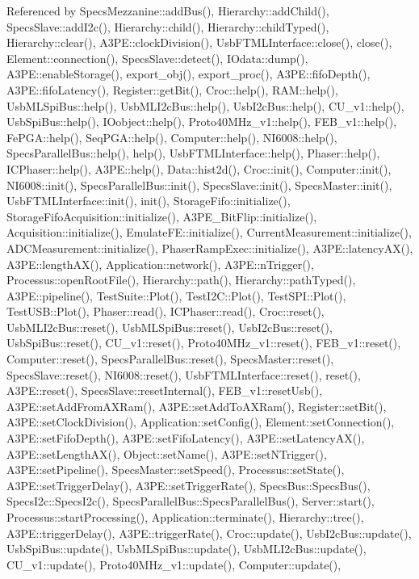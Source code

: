 Referenced by Specs\+Mezzanine\+::add\+Bus(), Hierarchy\+::add\+Child(), Specs\+Slave\+::add\+I2c(), Hierarchy\+::child(), Hierarchy\+::child\+Typed(), Hierarchy\+::clear(), A3\+P\+E\+::clock\+Division(), Usb\+F\+T\+M\+L\+Interface\+::close(), close(), Element\+::connection(), Specs\+Slave\+::detect(), I\+Odata\+::dump(), A3\+P\+E\+::enable\+Storage(), export\+\_\+obj(), export\+\_\+proc(), A3\+P\+E\+::fifo\+Depth(), A3\+P\+E\+::fifo\+Latency(), Register\+::get\+Bit(), Croc\+::help(), R\+A\+M\+::help(), Usb\+M\+L\+Spi\+Bus\+::help(), Usb\+M\+L\+I2c\+Bus\+::help(), Usb\+I2c\+Bus\+::help(), C\+U\+\_\+v1\+::help(), Usb\+Spi\+Bus\+::help(), I\+Oobject\+::help(), Proto40\+M\+Hz\+\_\+v1\+::help(), F\+E\+B\+\_\+v1\+::help(), Fe\+P\+G\+A\+::help(), Seq\+P\+G\+A\+::help(), Computer\+::help(), N\+I6008\+::help(), Specs\+Parallel\+Bus\+::help(), help(), Usb\+F\+T\+M\+L\+Interface\+::help(), Phaser\+::help(), I\+C\+Phaser\+::help(), A3\+P\+E\+::help(), Data\+::hist2d(), Croc\+::init(), Computer\+::init(), N\+I6008\+::init(), Specs\+Parallel\+Bus\+::init(), Specs\+Slave\+::init(), Specs\+Master\+::init(), Usb\+F\+T\+M\+L\+Interface\+::init(), init(), Storage\+Fifo\+::initialize(), Storage\+Fifo\+Acquisition\+::initialize(), A3\+P\+E\+\_\+\+Bit\+Flip\+::initialize(), Acquisition\+::initialize(), Emulate\+F\+E\+::initialize(), Current\+Measurement\+::initialize(), A\+D\+C\+Measurement\+::initialize(), Phaser\+Ramp\+Exec\+::initialize(), A3\+P\+E\+::latency\+A\+X(), A3\+P\+E\+::length\+A\+X(), Application\+::network(), A3\+P\+E\+::n\+Trigger(), Processus\+::open\+Root\+File(), Hierarchy\+::path(), Hierarchy\+::path\+Typed(), A3\+P\+E\+::pipeline(), Test\+Suite\+::\+Plot(), Test\+I2\+C\+::\+Plot(), Test\+S\+P\+I\+::\+Plot(), Test\+U\+S\+B\+::\+Plot(), Phaser\+::read(), I\+C\+Phaser\+::read(), Croc\+::reset(), Usb\+M\+L\+I2c\+Bus\+::reset(), Usb\+M\+L\+Spi\+Bus\+::reset(), Usb\+I2c\+Bus\+::reset(), Usb\+Spi\+Bus\+::reset(), C\+U\+\_\+v1\+::reset(), Proto40\+M\+Hz\+\_\+v1\+::reset(), F\+E\+B\+\_\+v1\+::reset(), Computer\+::reset(), Specs\+Parallel\+Bus\+::reset(), Specs\+Master\+::reset(), Specs\+Slave\+::reset(), N\+I6008\+::reset(), Usb\+F\+T\+M\+L\+Interface\+::reset(), reset(), A3\+P\+E\+::reset(), Specs\+Slave\+::reset\+Internal(), F\+E\+B\+\_\+v1\+::reset\+Usb(), A3\+P\+E\+::set\+Add\+From\+A\+X\+Ram(), A3\+P\+E\+::set\+Add\+To\+A\+X\+Ram(), Register\+::set\+Bit(), A3\+P\+E\+::set\+Clock\+Division(), Application\+::set\+Config(), Element\+::set\+Connection(), A3\+P\+E\+::set\+Fifo\+Depth(), A3\+P\+E\+::set\+Fifo\+Latency(), A3\+P\+E\+::set\+Latency\+A\+X(), A3\+P\+E\+::set\+Length\+A\+X(), Object\+::set\+Name(), A3\+P\+E\+::set\+N\+Trigger(), A3\+P\+E\+::set\+Pipeline(), Specs\+Master\+::set\+Speed(), Processus\+::set\+State(), A3\+P\+E\+::set\+Trigger\+Delay(), A3\+P\+E\+::set\+Trigger\+Rate(), Specs\+Bus\+::\+Specs\+Bus(), Specs\+I2c\+::\+Specs\+I2c(), Specs\+Parallel\+Bus\+::\+Specs\+Parallel\+Bus(), Server\+::start(), Processus\+::start\+Processing(), Application\+::terminate(), Hierarchy\+::tree(), A3\+P\+E\+::trigger\+Delay(), A3\+P\+E\+::trigger\+Rate(), Croc\+::update(), Usb\+I2c\+Bus\+::update(), Usb\+Spi\+Bus\+::update(), Usb\+M\+L\+Spi\+Bus\+::update(), Usb\+M\+L\+I2c\+Bus\+::update(), C\+U\+\_\+v1\+::update(), Proto40\+M\+Hz\+\_\+v1\+::update(), Computer\+::update(), 